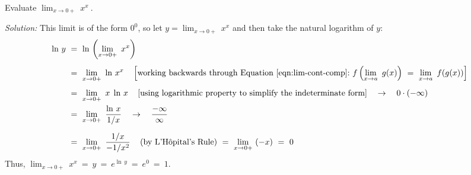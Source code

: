 \begin{exmp}\label{exmp:zerotozerolim}
\noindent Evaluate $\displaystyle\lim_{x \to 0+}~x^x~$.\vspace{1mm}
\par\noindent\emph{Solution:} This limit is of the form $0^0$, so let
$y = \displaystyle\lim_{x \to 0+}~x^x$ and then take the natural logarithm of
$y$:
\begin{align*}
\ln\,y ~&=~ \ln\,\left(\lim_{x \to 0+}~x^x\right)\\[4pt]
&=~ \lim_{x \to 0+}~\ln\,x^x \quad\left[\text{working backwards through Equation~\ref{eqn:lim-cont-comp}:}~\displaystyle f\left(\lim_{x \to a}~g(x)\right) ~=~ \lim_{x \to a}~f(g(x))\right]\\[4pt]
&=~ \lim_{x \to 0+}~x\;\ln\,x \quad\left[\text{using logarithmic property to simplify the indeterminate form}\right]\quad\to\quad 0 \cdot (-\infty)\\
&=~ \lim_{x \to 0+}~\frac{\ln\,x}{1/x} \quad\to\quad\frac{-\infty}{\infty}\\[6pt]
&=~ \lim_{x \to 0+}~\frac{1/x}{-1/x^2} \quad\left(\text{by L'H\^{o}pital's Rule}\right) ~=~ \lim_{x \to 0+}~(-x) ~=~ 0
\end{align*}
Thus, $\displaystyle\lim_{x \to 0+}~x^x ~=~ y ~=~ e^{\ln\,y} ~=~ e^0 ~=~ 1$.
\end{exmp}
\divider
\newpage

